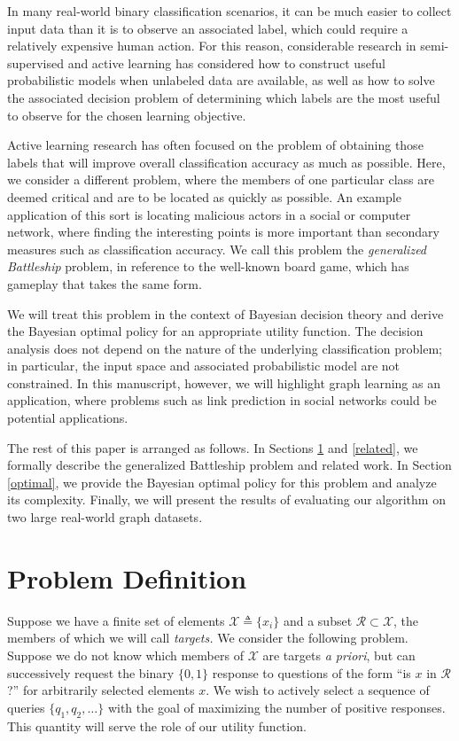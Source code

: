 \documentclass{article}
\newcommand{\cm}[1]{\mathcal{#1}}
\newcommand{\deq}{\triangleq}
\begin{document}
In many real-world binary classification scenarios, it can be much
easier to collect input data than it is to observe an associated
label, which could require a relatively expensive human action.  For
this reason, considerable research in semi-supervised and active
learning has considered how to construct useful probabilistic models
when unlabeled data are available, as well as how to solve the
associated decision problem of determining which labels are the most
useful to observe for the chosen learning objective.

Active learning research has often focused on the problem of obtaining
those labels that will improve overall classification accuracy as much
as possible.  Here, we consider a different problem, where the members
of one particular class are deemed critical and are to be located as
quickly as possible.  An example application of this sort is locating
malicious actors in a social or computer network, where finding the
interesting points is more important than secondary measures such as
classification accuracy.  We call this problem the \emph{generalized
  Battleship} problem, in reference to the well-known board game,
which has gameplay that takes the same form.

We will treat this problem in the context of Bayesian decision theory
and derive the Bayesian optimal policy for an appropriate utility
function.  The decision analysis does not depend on the nature of the
underlying classification problem; in particular, the input space and
associated probabilistic model are not constrained.  In this
manuscript, however, we will highlight graph learning as an
application, where problems such as link prediction in social networks
could be potential applications.

The rest of this paper is arranged as follows.  In Sections
\ref{problem} and \ref{related}, we formally describe the generalized
Battleship problem and related work.  In Section \ref{optimal}, we
provide the Bayesian optimal policy for this problem and analyze its
complexity.  Finally, we will present the results of evaluating our
algorithm on two large real-world graph datasets.

\section{Problem Definition}
\label{problem}

Suppose we have a finite set of elements $\cm{X} \deq \lbrace x_i
\rbrace$ and a subset $\cm{R} \subset\cm{X}$, the members of which we
will call \emph{targets.}  We consider the following problem.  Suppose
we do not know which members of $\cm{X}$ are targets \emph{a priori},
but can successively request the binary $\lbrace 0, 1 \rbrace$
response to questions of the form ``is $x$ in $\cm{R}$?'' for
arbitrarily selected elements $x$. We wish to actively select a
sequence of queries $\lbrace q_1, q_2, \dotsc \rbrace$ with the goal
of maximizing the number of positive responses.  This quantity will
serve the role of our utility function.
\end{document}
